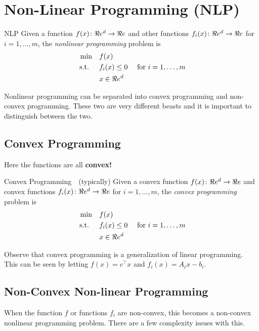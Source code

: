 \section{Non-Linear Programming (NLP)}
\label{sec:intro-NLP}
\begin{general}{NLP}{\nphard}
Given a function $f(x)\colon \Re e^d \to \Re e$ and other functions $f_i(x)\colon \Re e^d \to \Re e$ for $i=1, \dots, m$,  the \emph{nonlinear programming} problem is
\begin{equation}
\label{eq:NLP}
\begin{split}
\min \quad & f(x)\\
\mbox{ s.t. }  \quad & f_i(x) \leq 0  \quad  \mbox{ for } i=1, \dots, m\\
& x \in \Re e^d
\end{split}
\end{equation}
\end{general}

Nonlinear programming can be separated into convex programming and non-convex programming.  These two are very different beasts and it is important to distinguish between the two.
\subsection{Convex Programming}
Here the functions are all \textbf{convex!}
\begin{general}{Convex Programming}{\polynomial\ \  (typically)}
Given a convex function $f(x)\colon \Re e^d \to \Re e$ and convex functions $f_i(x)\colon \Re e^d \to \Re e$ for $i=1, \dots, m$,  the \emph{convex programming} problem is
\begin{equation}
\label{eq:convex-programming}
\begin{split}
\min \quad & f(x)\\
\mbox{ s.t. }  \quad & f_i(x) \leq 0  \quad  \mbox{ for } i=1, \dots, m\\
& x \in \Re e^d
\end{split}
\end{equation}
\end{general}

Observe that convex programming is a generalization of linear programming.  This can be seen by letting $f(x) = c^\top x$ and $f_i(x) = A_i x - b_i$.  

\subsection{Non-Convex Non-linear Programming}

When the function $f$ or functions $f_i$ are non-convex, this becomes a non-convex nonlinear programming problem.  There are a few complexity issues with this.

